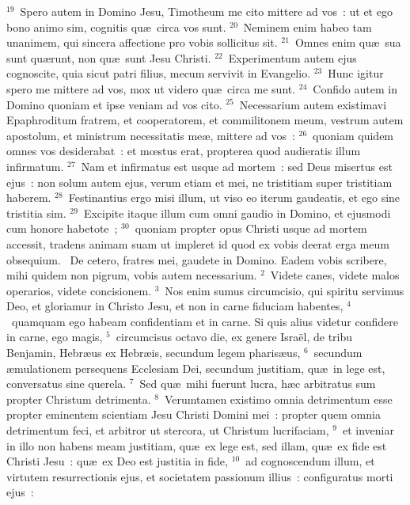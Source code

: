 ${}^{19}$~Spero autem in Domino Jesu, Timotheum me cito mittere ad vos~: ut et ego bono animo sim, cognitis qu\ae\ circa vos sunt.
${}^{20}$~Neminem enim habeo tam unanimem, qui sincera affectione pro vobis sollicitus sit.
${}^{21}$~Omnes enim qu\ae\ sua sunt qu\ae runt, non qu\ae\ sunt Jesu Christi.
${}^{22}$~Experimentum autem ejus cognoscite, quia sicut patri filius, mecum servivit in Evangelio.
${}^{23}$~Hunc igitur spero me mittere ad vos, mox ut videro qu\ae\ circa me sunt.
${}^{24}$~Confido autem in Domino quoniam et ipse veniam ad vos cito.
${}^{25}$~Necessarium autem existimavi Epaphroditum fratrem, et cooperatorem, et commilitonem meum, vestrum autem apostolum, et ministrum necessitatis me\ae , mittere ad vos~:
${}^{26}$~quoniam quidem omnes vos desiderabat~: et mœstus erat, propterea quod audieratis illum infirmatum.
${}^{27}$~Nam et infirmatus est usque ad mortem~: sed Deus misertus est ejus~: non solum autem ejus, verum etiam et mei, ne tristitiam super tristitiam haberem.
${}^{28}$~Festinantius ergo misi illum, ut viso eo iterum gaudeatis, et ego sine tristitia sim.
${}^{29}$~Excipite itaque illum cum omni gaudio in Domino, et ejusmodi cum honore habetote~;
${}^{30}$~quoniam propter opus Christi usque ad mortem accessit, tradens animam suam ut impleret id quod ex vobis deerat erga meum obsequium.
~\lettrine[lines=10,image=true,loversize=0.05,lraise=-0.03]{D}{}e cetero, fratres mei, gaudete in Domino. Eadem vobis scribere, mihi quidem non pigrum, vobis autem necessarium.
${}^{2}$~Videte canes, videte malos operarios, videte concisionem.
${}^{3}$~Nos enim sumus circumcisio, qui spiritu servimus Deo, et gloriamur in Christo Jesu, et non in carne fiduciam habentes,
${}^{4}$~quamquam ego habeam confidentiam et in carne. Si quis alius videtur confidere in carne, ego magis,
${}^{5}$~circumcisus octavo die, ex genere Isra\"el, de tribu Benjamin, Hebr\ae us ex Hebr\ae is, secundum legem pharis\ae us,
${}^{6}$~secundum \ae mulationem persequens Ecclesiam Dei, secundum justitiam, qu\ae\ in lege est, conversatus sine querela.
${}^{7}$~Sed qu\ae\ mihi fuerunt lucra, h\ae c arbitratus sum propter Christum detrimenta.
${}^{8}$~Verumtamen existimo omnia detrimentum esse propter eminentem scientiam Jesu Christi Domini mei~: propter quem omnia detrimentum feci, et arbitror ut stercora, ut Christum lucrifaciam,
${}^{9}$~et inveniar in illo non habens meam justitiam, qu\ae\ ex lege est, sed illam, qu\ae\ ex fide est Christi Jesu~: qu\ae\ ex Deo est justitia in fide,
${}^{10}$~ad cognoscendum illum, et virtutem resurrectionis ejus, et societatem passionum illius~: configuratus morti ejus~:
